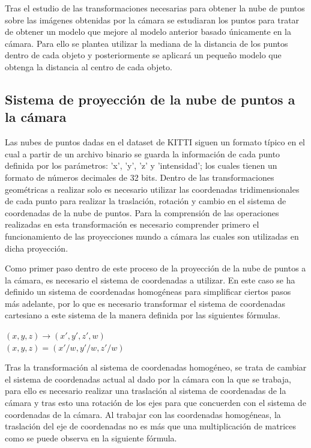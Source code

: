 Tras el estudio de las transformaciones necesarias para obtener la nube de puntos sobre las imágenes obtenidas por la cámara se estudiaran los puntos para tratar de obtener un modelo que mejore al modelo anterior basado únicamente en la cámara. Para ello se plantea utilizar la mediana de la distancia de los puntos dentro de cada objeto y posteriormente se aplicará un pequeño modelo que obtenga la distancia al centro de cada objeto.

\subsection{Sistema de proyección de la nube de puntos a la cámara}
\label{sec:Sistema de proyección de la nube de puntos a la cámara}

Las nubes de puntos dadas en el dataset de KITTI siguen un formato típico en el cual a partir de un archivo binario se guarda la información de cada punto definida por los parámetros: 'x', 'y', 'z' y 'intensidad'; los cuales tienen un formato de números decimales de 32 bits. Dentro de las transformaciones geométricas a realizar solo es necesario utilizar las coordenadas tridimensionales de cada punto para realizar la traslación, rotación y cambio en el sistema de coordenadas de la nube de puntos. Para la comprensión de las operaciones realizadas en esta transformación es necesario comprender primero el funcionamiento de las proyecciones mundo a cámara las cuales son utilizadas en dicha proyección.

Como primer paso dentro de este proceso de la proyección de la nube de puntos a la cámara, es necesario el sistema de coordenadas a utilizar. En este caso se ha definido un sistema de coordenadas homogéneas para simplificar ciertos pasos más adelante, por lo que es necesario transformar el sistema de coordenadas cartesiano a este sistema de la manera definida por las siguientes fórmulas.

\begin{center}
$(x, y, z) \rightarrow (x', y', z', w)$\\[10pt]
$(x, y, z) = (x'/w, y'/w, z'/w)$
\end{center}

Tras la transformación al sistema de coordenadas homogéneo, se trata de cambiar el sistema de coordenadas actual al dado por la cámara con la que se trabaja, para ello es necesario realizar una traslación al sistema de coordenadas de la cámara y tras esto una rotación de los ejes para que concuerden con el sistema de coordenadas de la cámara. Al trabajar con las coordenadas homogéneas, la traslación del eje de coordenadas no es más que una multiplicación de matrices como se puede observa en la siguiente fórmula.

